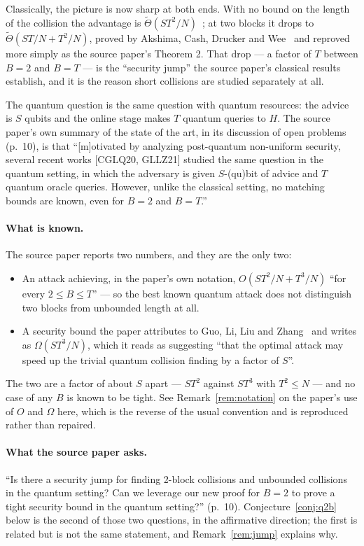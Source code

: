 \documentclass{aicr-conjecture}
\newcommand{\tTh}{\tilde{\Theta}}
\begin{document}
Classically, the picture is now sharp at both ends. With no bound on
the length of the collision the advantage is
$\tTh(ST^{2}/N)$~\cite{CDGS18}; at two blocks it drops to
$\tTh(ST/N + T^{2}/N)$, proved by Akshima, Cash, Drucker and
Wee~\cite{ACDW20} and reproved more simply as the source paper's
Theorem 2. That drop --- a factor of $T$ between $B = 2$ and $B = T$
--- is the ``security jump'' the source paper's classical results
establish, and it is the reason short collisions are studied separately
at all.

The quantum question is the same question with quantum resources: the
advice is $S$ qubits and the online stage makes $T$ quantum queries to
$H$. The source paper's own summary of the state of the art, in its
discussion of open problems (p.~10), is that ``[m]otivated by analyzing
post-quantum non-uniform security, several recent works [CGLQ20,
GLLZ21] studied the same question in the quantum setting, in which the
adversary is given $S$-(qu)bit of advice and $T$ quantum oracle
queries. However, unlike the classical setting, no matching bounds are
known, even for $B = 2$ and $B = T$.''

\paragraph{What is known.}
The source paper reports two numbers, and they are the only two:

\begin{itemize}
\item An attack achieving, in the paper's own notation,
  $O(ST^{2}/N + T^{3}/N)$ ``for every $2 \le B \le T$'' --- so the best
  known quantum attack does not distinguish two blocks from unbounded
  length at all.
\item A security bound the paper attributes to Guo, Li, Liu and
  Zhang~\cite{GLLZ21} and writes as $\Omega(ST^{3}/N)$, which it reads
  as suggesting ``that the optimal attack may speed up the trivial
  quantum collision finding by a factor of $S$''.
\end{itemize}

The two are a factor of about $S$ apart --- $ST^{2}$ against $ST^{3}$
with $T^{2} \le N$ --- and no case of any $B$ is known to be tight. See
Remark~\ref{rem:notation} on the paper's use of $O$ and $\Omega$ here,
which is the reverse of the usual convention and is reproduced rather
than repaired.

\paragraph{What the source paper asks.}
``Is there a security jump for finding 2-block collisions and unbounded
collisions in the quantum setting? Can we leverage our new proof for
$B = 2$ to prove a tight security bound in the quantum setting?''
(p.~10). Conjecture~\ref{conj:q2b} below is the second of those two
questions, in the affirmative direction; the first is related but is
not the same statement, and Remark~\ref{rem:jump} explains why.
\end{document}
